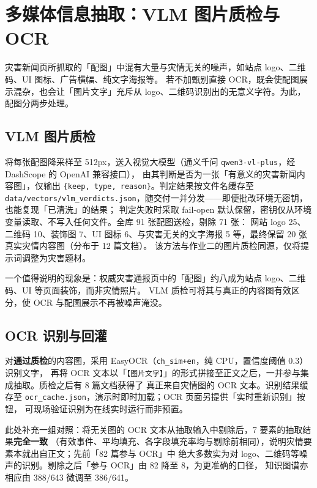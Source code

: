 \documentclass[11pt,a4paper]{ctexart}
\begin{document}
\section{多媒体信息抽取：VLM 图片质检与 OCR}

灾害新闻页所抓取的「配图」中混有大量与灾情无关的噪声，如站点 logo、二维码、UI 图标、广告横幅、纯文字海报等。
若不加甄别直接 OCR，既会使配图展示混杂，也会让「图片文字」充斥从 logo、二维码识别出的无意义字符。为此，配图分两步处理。

\subsection{VLM 图片质检}

将每张配图降采样至 512px，送入视觉大模型（通义千问 \texttt{qwen3-vl-plus}，经 DashScope 的 OpenAI 兼容接口），
由其判断是否为一张「有意义的灾害新闻内容图」，仅输出 \texttt{\{keep, type, reason\}}。判定结果按文件名缓存至
\texttt{data/vectors/vlm\_verdicts.json}，随交付一并分发——即便批改环境无密钥，也能复现「已清洗」的结果；
判定失败时采取 fail-open 默认保留，密钥仅从环境变量读取、不写入任何文件。全库 91 张配图送检，剔除 71 张：
网站 logo 25、二维码 10、装饰图 7、UI 图标 6、与灾害无关的文字海报 5 等，最终保留 20 张真实灾情内容图（分布于 12 篇文档）。
该方法与作业二的图片质检同源，仅将提示词调整为灾害题材。

一个值得说明的现象是：权威灾害通报页中的「配图」约八成为站点 logo、二维码、UI 等页面装饰，而非灾情照片。
VLM 质检可将其与真正的内容图有效区分，使 OCR 与配图展示不再被噪声淹没。

\subsection{OCR 识别与回灌}

对\textbf{通过质检}的内容图，采用 EasyOCR（\texttt{ch\_sim+en}，纯 CPU，置信度阈值 0.3）识别文字，
再将 OCR 文本以「\texttt{【图片文字】}」的形式拼接至正文之后，一并参与集成抽取。质检之后有 8 篇文档获得了
真正来自灾情图的 OCR 文本。识别结果缓存至 \texttt{ocr\_cache.json}，演示时即时加载；OCR 页面另提供「实时重新识别」按钮，
可现场验证识别为在线实时运行而非预置。

此处补充一组对照：将无关图的 OCR 文本从抽取输入中剔除后，7 要素的抽取结果\textbf{完全一致}
（有效事件、平均填充、各字段填充率均与剔除前相同），说明灾情要素本就出自正文；先前「82 篇参与 OCR」中
绝大多数实为对 logo、二维码等噪声的识别。剔除之后「参与 OCR」由 82 降至 8，为更准确的口径，
知识图谱亦相应由 388/643 微调至 386/641。
\end{document}
